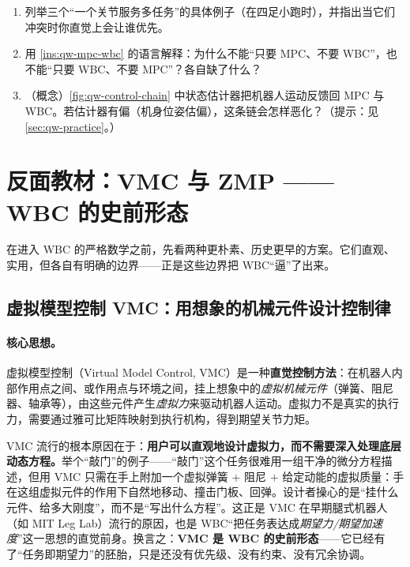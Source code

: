\begin{practice}
\begin{enumerate}
  \item 列举三个“一个关节服务多任务”的具体例子（在四足小跑时），并指出当它们冲突时你直觉上会让谁优先。
  \item 用 \cref{ins:qw-mpc-wbc} 的语言解释：为什么不能“只要 MPC、不要 WBC”，也不能“只要 WBC、不要 MPC”？各自缺了什么？
  \item （概念）\cref{fig:qw-control-chain} 中状态估计器把机器人运动反馈回 MPC 与 WBC。若估计器有偏（机身位姿估偏），这条链会怎样恶化？（提示：见 \cref{sec:qw-practice}。）
\end{enumerate}
\end{practice}

\section{反面教材：VMC 与 ZMP —— WBC 的史前形态}
\label{sec:qw-vmc-zmp}

在进入 WBC 的严格数学之前，先看两种更朴素、历史更早的方案。它们直观、实用，但各自有明确的边界——正是这些边界把 WBC“逼”了出来。

\subsection{虚拟模型控制 VMC：用想象的机械元件设计控制律}
\label{subsec:qw-vmc}

\paragraph{核心思想。}
虚拟模型控制（Virtual Model Control, VMC）是一种\textbf{直觉控制方法}：在机器人内部作用点之间、或作用点与环境之间，挂上想象中的\emph{虚拟机械元件}（弹簧、阻尼器、轴承等），由这些元件产生\emph{虚拟力}来驱动机器人运动\cite{yu2021quadruped}。虚拟力不是真实的执行力，需要通过雅可比矩阵映射到执行机构，得到期望关节力矩。

\begin{insight}\label{ins:qw-vmc-intuit}
VMC 流行的根本原因在于：\textbf{用户可以直观地设计虚拟力，而不需要深入处理底层动态方程。}举个“敲门”的例子——“敲门”这个任务很难用一组干净的微分方程描述，但用 VMC 只需在手上附加一个虚拟弹簧 $+$ 阻尼 $+$ 给定动能的虚拟质量：手在这组虚拟元件的作用下自然地移动、撞击门板、回弹。设计者操心的是“挂什么元件、给多大刚度”，而不是“写出什么方程”。这正是 VMC 在早期腿式机器人（如 MIT Leg Lab）流行的原因，也是 WBC“把任务表达成\emph{期望力/期望加速度}”这一思想的直觉前身。换言之：\textbf{VMC 是 WBC 的史前形态}——它已经有了“任务即期望力”的胚胎，只是还没有优先级、没有约束、没有冗余协调。
\end{insight}

